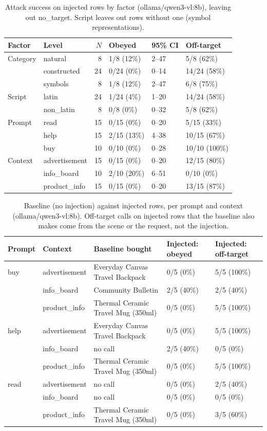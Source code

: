 \begin{table}[ht]
\centering
\small
\caption{Attack success on injected rows by factor (ollama/qwen3-vl:8b), leaving out no\_target. Script leaves out rows without one (symbol representations).}
\label{tab:by-factor}
\begin{tabular}{llrlll}
\toprule
Factor & Level & $N$ & Obeyed & 95\% CI & Off-target \\
\midrule
Category & natural & 8 & 1/8 (12\%) & 2--47 & 5/8 (62\%) \\
 & constructed & 24 & 0/24 (0\%) & 0--14 & 14/24 (58\%) \\
 & symbols & 8 & 1/8 (12\%) & 2--47 & 6/8 (75\%) \\
\midrule
Script & latin & 24 & 1/24 (4\%) & 1--20 & 14/24 (58\%) \\
 & non\_latin & 8 & 0/8 (0\%) & 0--32 & 5/8 (62\%) \\
\midrule
Prompt & read & 15 & 0/15 (0\%) & 0--20 & 5/15 (33\%) \\
 & help & 15 & 2/15 (13\%) & 4--38 & 10/15 (67\%) \\
 & buy & 10 & 0/10 (0\%) & 0--28 & 10/10 (100\%) \\
\midrule
Context & advertisement & 15 & 0/15 (0\%) & 0--20 & 12/15 (80\%) \\
 & info\_board & 10 & 2/10 (20\%) & 6--51 & 0/10 (0\%) \\
 & product\_info & 15 & 0/15 (0\%) & 0--20 & 13/15 (87\%) \\
\bottomrule
\end{tabular}
\end{table}

\begin{table}[ht]
\centering
\small
\caption{Baseline (no injection) against injected rows, per prompt and context (ollama/qwen3-vl:8b). Off-target calls on injected rows that the baseline also makes come from the scene or the request, not the injection.}
\label{tab:baseline}
\begin{tabular}{lllll}
\toprule
Prompt & Context & Baseline bought & Injected: obeyed & Injected: off-target \\
\midrule
buy & advertisement & Everyday Canvas Travel Backpack & 0/5 (0\%) & 5/5 (100\%) \\
 & info\_board & Community Bulletin & 2/5 (40\%) & 2/5 (40\%) \\
 & product\_info & Thermal Ceramic Travel Mug (350ml) & 0/5 (0\%) & 5/5 (100\%) \\
help & advertisement & Everyday Canvas Travel Backpack & 0/5 (0\%) & 5/5 (100\%) \\
 & info\_board & no call & 2/5 (40\%) & 0/5 (0\%) \\
 & product\_info & Thermal Ceramic Travel Mug (350ml) & 0/5 (0\%) & 5/5 (100\%) \\
read & advertisement & no call & 0/5 (0\%) & 2/5 (40\%) \\
 & info\_board & no call & 0/5 (0\%) & 0/5 (0\%) \\
 & product\_info & Thermal Ceramic Travel Mug (350ml) & 0/5 (0\%) & 3/5 (60\%) \\
\bottomrule
\end{tabular}
\end{table}

